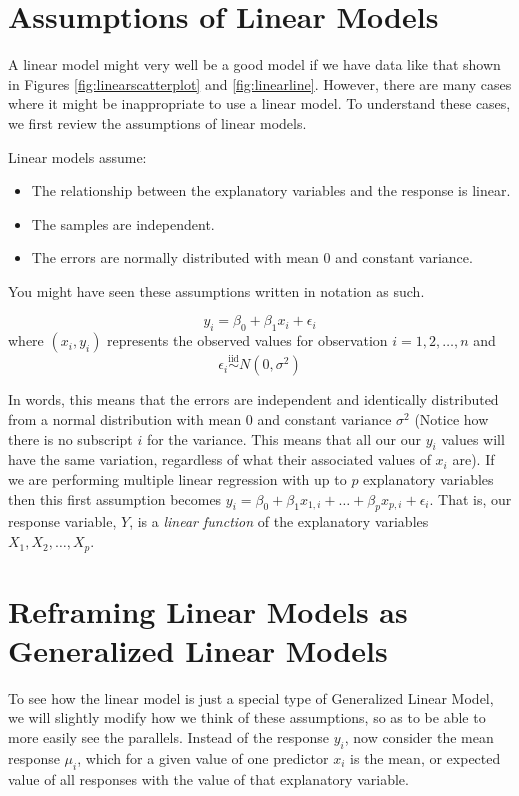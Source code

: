 \documentclass[
]{book}
\providecommand{\tightlist}{%
  \setlength{\itemsep}{0pt}\setlength{\parskip}{0pt}}
\begin{document}
\hypertarget{linear-assumptions}{%
\section{Assumptions of Linear Models}\label{linear-assumptions}}

A linear model might very well be a good model if we have data like that shown in Figures \ref{fig:linearscatterplot} and \ref{fig:linearline}. However, there are many cases where it might be inappropriate to use a linear model. To understand these cases, we first review the assumptions of linear models.

Linear models assume:

\begin{itemize}
\tightlist
\item
  The relationship between the explanatory variables and the response is linear.
\item
  The samples are independent.
\item
  The errors are normally distributed with mean 0 and constant variance.
\end{itemize}

You might have seen these assumptions written in notation as such.

\[y_i  = \beta_0 + \beta_1 x_i + \epsilon_i \]
where \((x_i, y_i)\) represents the observed values for observation \(i = 1, 2, \ldots, n\) and
\[ \epsilon_i \overset{\text{iid}}{\sim} N(0,\sigma^2)\]

In words, this means that the errors are independent and identically distributed from a normal distribution with mean 0 and constant variance \(\sigma^2\) (Notice how there is no subscript \(i\) for the variance. This means that all our our \(y_i\) values will have the same variation, regardless of what their associated values of \(x_i\) are). If we are performing multiple linear regression with up to \(p\) explanatory variables then this first assumption becomes \(y_i = \beta_0 + \beta_1 x_{1,i} + \ldots + \beta_p x_{p,i} + \epsilon_i\). That is, our response variable, \(Y\), is a \emph{linear function} of the explanatory variables \(X_1, X_2, \ldots, X_p\).

\hypertarget{reframing-linear-model}{%
\section{Reframing Linear Models as Generalized Linear Models}\label{reframing-linear-model}}

To see how the linear model is just a special type of Generalized Linear Model, we will slightly modify how we think of these assumptions, so as to be able to more easily see the parallels. Instead of the response \(y_i\), now consider the mean response \(\mu_i\), which for a given value of one predictor \(x_i\) is the mean, or expected value of all responses with the value of that explanatory variable.
\end{document}

